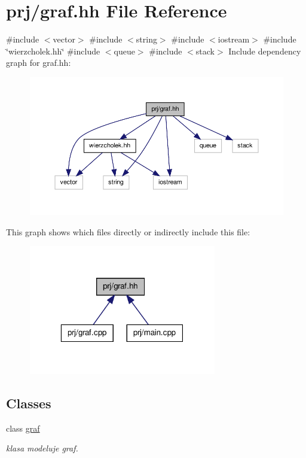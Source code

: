 \hypertarget{graf_8hh}{\section{prj/graf.hh \-File \-Reference}
\label{graf_8hh}
}
{\ttfamily \#include $<$vector$>$}\*
{\ttfamily \#include $<$string$>$}\*
{\ttfamily \#include $<$iostream$>$}\*
{\ttfamily \#include \char`\"{}wierzcholek.\-hh\char`\"{}}\*
{\ttfamily \#include $<$queue$>$}\*
{\ttfamily \#include $<$stack$>$}\*
\-Include dependency graph for graf.\-hh\-:\nopagebreak
\begin{figure}[H]
\begin{center}
\leavevmode
\includegraphics[width=350pt]{graf_8hh__incl}
\end{center}
\end{figure}
\-This graph shows which files directly or indirectly include this file\-:\nopagebreak
\begin{figure}[H]
\begin{center}
\leavevmode
\includegraphics[width=232pt]{graf_8hh__dep__incl}
\end{center}
\end{figure}
\subsection*{\-Classes}
\begin{DoxyCompactItemize}
\item 
class \hyperlink{classgraf}{graf}
\begin{DoxyCompactList}\small\item\em klasa modeluje graf. \end{DoxyCompactList}\end{DoxyCompactItemize}
